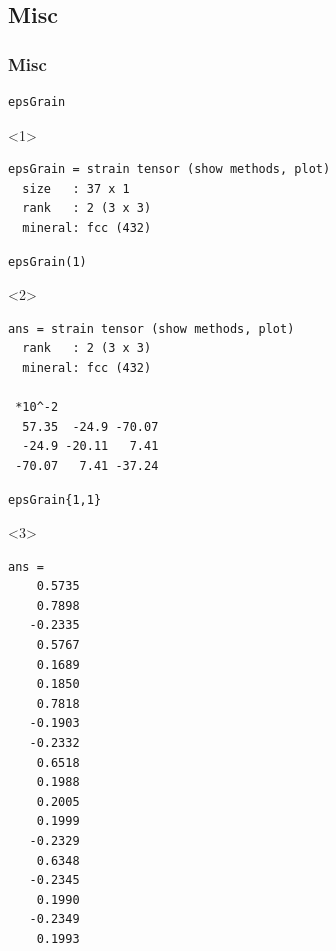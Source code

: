 \documentclass[compress]{beamer}
\begin{document}
\begin{frame}[fragile]
\begin{columns}
\begin{column}{0.29\textwidth}
  \end{column}
   \end{columns}
\end{frame}

\subsection*{Misc}

\begin{frame}[fragile]
  \frametitle{Misc}
  \vspace{-0.5cm}
  \begin{overlayarea}{\textwidth}{8cm}

      \begin{lstlisting}[style=input]
epsGrain
\end{lstlisting}
\begin{onlyenv}<1>
    \vspace{-0.3cm}
  \begin{lstlisting}[style=output]
epsGrain = strain tensor (show methods, plot)
  size   : 37 x 1
  rank   : 2 (3 x 3)
  mineral: fcc (432)
\end{lstlisting}
\end{onlyenv}
\pause

  \begin{lstlisting}[style=input]
epsGrain(1)
\end{lstlisting}
\begin{onlyenv}<2>
    \vspace{-0.3cm}
    \begin{lstlisting}[style=output]
ans = strain tensor (show methods, plot)
  rank   : 2 (3 x 3)
  mineral: fcc (432)

 *10^-2
  57.35  -24.9 -70.07
  -24.9 -20.11   7.41
 -70.07   7.41 -37.24
\end{lstlisting}
\end{onlyenv}
\pause
\begin{lstlisting}[style=input]
epsGrain{1,1}
\end{lstlisting}
\begin{onlyenv}<3>
  \vspace{-0.3cm}
\begin{lstlisting}[style=output]
ans =
    0.5735
    0.7898
   -0.2335
    0.5767
    0.1689
    0.1850
    0.7818
   -0.1903
   -0.2332
    0.6518
    0.1988
    0.2005
    0.1999
   -0.2329
    0.6348
   -0.2345
    0.1990
   -0.2349
    0.1993
\end{lstlisting}
\end{onlyenv}
\end{overlayarea}
\end{frame}
\end{document}
